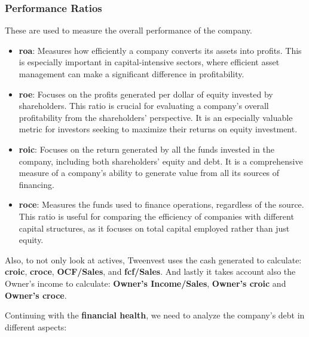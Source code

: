 \documentclass[11pt,english,a4paper,hidelinks]{book}
\begin{document}
\subsubsection{Performance Ratios}
These are used to measure the overall performance of the company.
\begin{itemize}
    \item \textbf{\gls{roa}}: Measures how efficiently a company converts its assets into profits. This is especially important in capital-intensive sectors, where efficient asset management can make a significant difference in profitability.
    
    \item \textbf{\gls{roe}}: Focuses on the profits generated per dollar of equity invested by shareholders. This ratio is crucial for evaluating a company's overall profitability from the shareholders' perspective. It is an especially valuable metric for investors seeking to maximize their returns on equity investment.
    
    \item \textbf{\gls{roic}}: Focuses on the return generated by all the funds invested in the company, including both shareholders' equity and debt. It is a comprehensive measure of a company's ability to generate value from all its sources of financing.
    
    \item \textbf{\gls{roce}}: Measures the funds used to finance operations, regardless of the source. This ratio is useful for comparing the efficiency of companies with different capital structures, as it focuses on total capital employed rather than just equity.
\end{itemize}

\noindent Also, to not only look at actives, Tweenvest uses the cash generated to calculate: \textbf{\gls{croic}}, \textbf{\gls{croce}}, \textbf{OCF/Sales}, and \textbf{\gls{fcf}/Sales}. And lastly it takes account also the Owner's income to calculate: \textbf{Owner's Income/Sales}, \textbf{Owner's \gls{croic}} and \textbf{Owner's \gls{croce}}.

\vspace{0.5cm}
\noindent Continuing with the \textbf{financial health}, we need to analyze the company's debt in different aspects:

\end{document}
